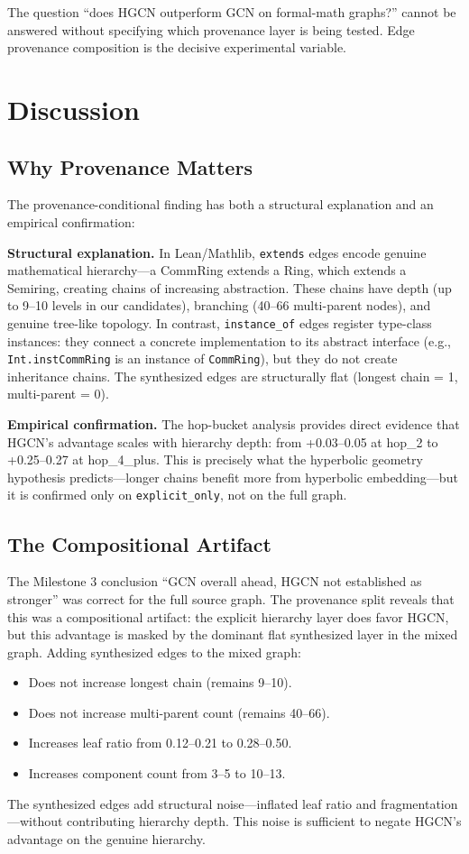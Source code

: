 \documentclass[runningheads]{llncs}
\newcommand{\enquote}[1]{``#1''}
\begin{document}
The question \enquote{does HGCN outperform GCN on formal-math graphs?} cannot be answered without specifying which provenance layer is being tested. Edge provenance composition is the decisive experimental variable.

\section{Discussion}

\subsection{Why Provenance Matters}

The provenance-conditional finding has both a structural explanation and an empirical confirmation:

\textbf{Structural explanation.}
In Lean/Mathlib, \texttt{extends} edges encode genuine mathematical hierarchy---a CommRing extends a Ring, which extends a Semiring, creating chains of increasing abstraction. These chains have depth (up to 9--10 levels in our candidates), branching (40--66 multi-parent nodes), and genuine tree-like topology. In contrast, \texttt{instance\_of} edges register type-class instances: they connect a concrete implementation to its abstract interface (e.g., \texttt{Int.instCommRing} is an instance of \texttt{CommRing}), but they do not create inheritance chains. The synthesized edges are structurally flat (longest chain = 1, multi-parent = 0).

\textbf{Empirical confirmation.}
The hop-bucket analysis provides direct evidence that HGCN's advantage scales with hierarchy depth: from +0.03--0.05 at hop\_2 to +0.25--0.27 at hop\_4\_plus. This is precisely what the hyperbolic geometry hypothesis predicts---longer chains benefit more from hyperbolic embedding---but it is confirmed only on \texttt{explicit\_only}, not on the full graph.

\subsection{The Compositional Artifact}

The Milestone 3 conclusion \enquote{GCN overall ahead, HGCN not established as stronger} was correct for the full source graph. The provenance split reveals that this was a compositional artifact: the explicit hierarchy layer does favor HGCN, but this advantage is masked by the dominant flat synthesized layer in the mixed graph. Adding synthesized edges to the mixed graph:
\begin{itemize}
\item Does not increase longest chain (remains 9--10).
\item Does not increase multi-parent count (remains 40--66).
\item Increases leaf ratio from 0.12--0.21 to 0.28--0.50.
\item Increases component count from 3--5 to 10--13.
\end{itemize}
The synthesized edges add structural noise---inflated leaf ratio and fragmentation---without contributing hierarchy depth. This noise is sufficient to negate HGCN's advantage on the genuine hierarchy.
\end{document}
